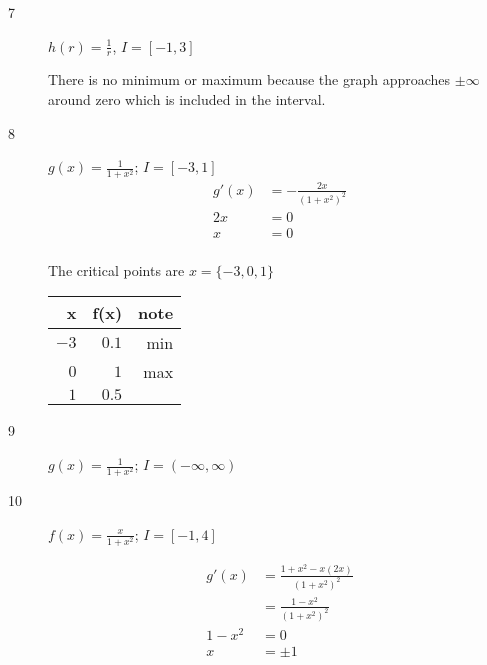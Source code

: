 \documentclass[fleqn]{exam}
\begin{document}
\begin{description}
\item[7] $h(r) = \frac{1}{r}$, $I = [-1, 3]$



There is no minimum or maximum because the graph approaches $\pm \infty$ around zero which is included in the interval.

\item[8] $g(x) = \frac{1}{1+x^2}$; $I = [-3, 1]$
\begin{align*}
  g'(x) &= -\frac{2x}{(1 + x^2)^2} \\ 
  2x &= 0 \\
  x  &= 0 \\
\end{align*}

The critical points are $x = \{-3, 0, 1\}$

\begin{tabular}{rrr}
\toprule
x   & f(x) & note \\
\midrule
$-3$            &  $0.1$        &  min \\
$0$            &  $1$           &  max \\
$1$            &  $0.5$          &   \\
\bottomrule
\end{tabular}

\item[9]
$g(x) = \frac{1}{1+x^2}$; $I = (- \infty, \infty)$


\item[10] 
$f(x) = \frac{x}{1+x^2}$; $I = [-1, 4]$

\begin{align*}
  g'(x) &= \frac{1+x^2 - x(2x)}{(1 + x^2)^2} \\ 
        &= \frac{1 - x^2}{(1 + x^2)^2} \\ 
  1 - x^2 &= 0 \\
  x  &= \pm 1 \\
\end{align*}


\end{description}
\end{document}

